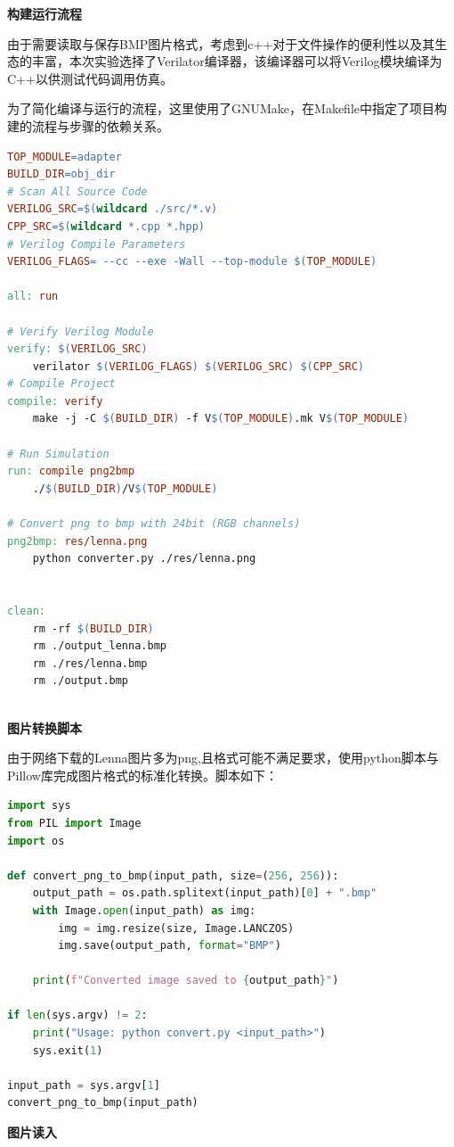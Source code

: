 \documentclass[12pt, a4paper]{article}
\begin{document}
\noindent\textbf{构建运行流程}

由于需要读取与保存BMP图片格式，考虑到c++对于文件操作的便利性以及其生态的丰富，本次实验选择了Verilator编译器，该编译器可以将Verilog模块编译为C++以供测试代码调用仿真。

为了简化编译与运行的流程，这里使用了GNUMake，在Makefile中指定了项目构建的流程与步骤的依赖关系。

\begin{lstlisting}[language=Makefile]
TOP_MODULE=adapter
BUILD_DIR=obj_dir
# Scan All Source Code
VERILOG_SRC=$(wildcard ./src/*.v)
CPP_SRC=$(wildcard *.cpp *.hpp)
# Verilog Compile Parameters
VERILOG_FLAGS= --cc --exe -Wall --top-module $(TOP_MODULE)

all: run

# Verify Verilog Module
verify: $(VERILOG_SRC)
    verilator $(VERILOG_FLAGS) $(VERILOG_SRC) $(CPP_SRC)
# Compile Project
compile: verify
    make -j -C $(BUILD_DIR) -f V$(TOP_MODULE).mk V$(TOP_MODULE)

# Run Simulation
run: compile png2bmp
    ./$(BUILD_DIR)/V$(TOP_MODULE)

# Convert png to bmp with 24bit (RGB channels)
png2bmp: res/lenna.png
    python converter.py ./res/lenna.png


clean:
    rm -rf $(BUILD_DIR)
    rm ./output_lenna.bmp
    rm ./res/lenna.bmp
    rm ./output.bmp
    
\end{lstlisting}

\noindent\textbf{图片转换脚本}

由于网络下载的Lenna图片多为png,且格式可能不满足要求，使用python脚本与Pillow库完成图片格式的标准化转换。脚本如下：
\begin{lstlisting}[language=python]
import sys
from PIL import Image
import os

def convert_png_to_bmp(input_path, size=(256, 256)):
    output_path = os.path.splitext(input_path)[0] + ".bmp"
    with Image.open(input_path) as img:
        img = img.resize(size, Image.LANCZOS)
        img.save(output_path, format="BMP")

    print(f"Converted image saved to {output_path}")

if len(sys.argv) != 2:
    print("Usage: python convert.py <input_path>")
    sys.exit(1)

input_path = sys.argv[1]
convert_png_to_bmp(input_path)
\end{lstlisting}

\noindent\textbf{图片读入}
\end{document}
